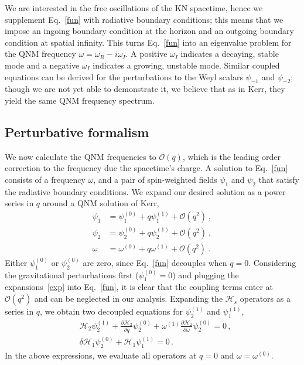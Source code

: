 \begin{refsection}
We are interested in the free oscillations of the KN spacetime, hence we supplement Eq.~\eqref{fun} with radiative boundary conditions; this means that we impose an ingoing boundary condition at the horizon and an outgoing boundary condition at spatial infinity. This turns  Eq.~\eqref{fun} into an eigenvalue problem for the QNM frequency $\omega =\omega_R -i\omega_I$. A positive $\omega_I$ indicates a decaying, stable mode and a negative $\omega_I$ indicates a growing, unstable mode.
Similar coupled equations can be derived for the perturbations to the Weyl scalars $\psi_{-1}$ and $\psi_{-2}$; though we are not yet able to demonstrate it, we believe that as in Kerr, they yield the same QNM frequency spectrum. 

\subsection{Perturbative formalism} 
We now calculate the QNM frequencies to $\mathcal{O}(q)$, which is the leading order correction to the frequency due the spacetime's charge. A solution to Eq.~\eqref{fun} consists of a frequency $\omega$, and a pair of spin-weighted fields $\psi_1$ and $\psi_2$ that satisfy the radiative boundary conditions. We expand our desired solution as a power series in $q$ around a QNM solution of Kerr,
\begin{align}
\psi_1 &= \psi_1^{(0)}+ q\psi_1^{(1)}+\mathcal{O}(q^2) \ , \nonumber\\ 
\psi_2 &= \psi_2^{(0)}+ q\psi_2^{(1)}+\mathcal{O}(q^2) \ , \nonumber\\ 
\omega &= \omega^{(0)}+ q\omega^{(1)}+\mathcal{O}(q^2) \ . \label{exp}
\end{align}
Either $\psi_1^{(0)}$ or $\psi_2^{(0)}$ are zero, since Eq.~\eqref{fun} decouples when $q=0$. Considering the gravitational perturbations first ($\psi_1^{(0)} = 0$) and plugging the expansions~\eqref{exp} into Eq.~\eqref{fun}, it is clear that the coupling terms enter at $\mathcal{O}(q^2)$ and can be neglected in our analysis. Expanding the $\mathcal{H}_s$ operators as a series in $q$, we obtain two decoupled equations for $\psi_2^{(1)}$ and $\psi_1^{(1)}$,
\begin{align}
&\mathcal{H}_2 \psi_2^{(1)} + \frac{\partial \mathcal{H}_2}{\partial q} \psi_2^{(0)}+ \omega^{(1)}\frac{\partial \mathcal{H}_2}{\partial \omega} \psi_2^{(0)} =0 \label{qmain}\,, \\
&\delta \mathcal{H}_1 \psi_2^{(0)}+ \mathcal{H}_1 \psi_1^{(1)}=0\,.
\end{align}
In the above expressions, we evaluate all operators at $q=0$ and $\omega = \omega^{(0)}$.


\end{refsection}
